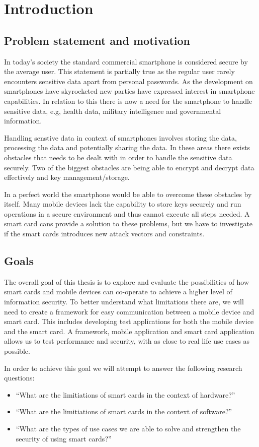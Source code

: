 \chapter{Introduction}
\section{Problem statement and motivation}
In today's society the standard commercial smartphone is considered secure by the average user. This statement is partially true as the regular user rarely encounters sensitive data apart from personal passwords. As the development on smartphones have skyrocketed new parties have expressed interest in smartphone capabilities. In relation to this there is now a need for the smartphone to handle sensitive data, e.g, health data, military intelligence and governmental information.

Handling senstive data in context of smartphones involves storing the data, processing the data and potentially sharing the data. In these areas there exists obstacles that needs to be dealt with in order to handle the sensitive data securely. Two of the biggest obstacles are being able to encrypt and decrypt data effectively and key management/storage.

 In a perfect world the smartphone would be able to overcome these obstacles by itself. Many mobile devices lack the capability to store keys securely and run operations in a secure environment and thus cannot execute all steps needed. A smart card cans provide a solution to these problems, but we have to investigate if the smart cards introduces new attack vectors and constraints.

\section{Goals}
\label{sec:goals}
The overall goal of this thesis is to explore and evaluate the possibilities of how smart cards and mobile devices can co-operate to achieve a higher level of information security. To better understand what limitations there are, we will need to create a framework for easy communication between a mobile device and smart card. This includes developing test applications for both the mobile device and the smart card. A framework, mobile application and smart card application allows us to test performance and security, with as close to real life use cases as possible.

In order to achieve this goal we will attempt to answer the following research questions:
\begin{itemize}
  \item ``What are the limitiations of smart cards in the context of hardware?''
  \item ``What are the limitiations of smart cards in the context of software?''
  \item ``What are the types of use cases we are able to solve and strengthen the security of using smart cards?''
\end{itemize}


